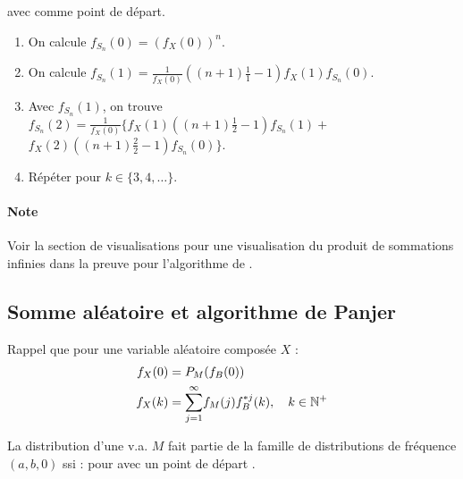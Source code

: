 \documentclass[10pt, french]{article}
\begin{document}
\begin{multicols*}{2}
\begin{algo2}
avec  comme point de départ.

\tcbline

\begin{enumerate}
	\item	On calcule $f_{S_{n}}(0)	=	\left(f_{X}(0)\right)^{n}$.
	\item	On calcule $f_{S_{n}}(1)	=	\frac{1}{f_{X}(0)} \left((n + 1)\frac{1}{1} - 1\right)f_{X}(1)f_{S_{n}}(0)$.
	\item	Avec $f_{S_{n}}(1)$, on trouve $f_{S_{n}}(2)	=	\frac{1}{f_{X}(0)} \bigg\{ f_{X}(1)\left((n + 1)\frac{1}{2} - 1\right)f_{S_{n}}(1)	+$ $ f_{X}(2)\left((n + 1)\frac{2}{2} - 1\right)f_{S_{n}}(0) \bigg\}$.
	\item	Répéter pour $k \in \{3, 4, \dots\}$.
\end{enumerate}
\end{algo2}

\paragraph{Note}	Voir la section de visualisations pour une visualisation du produit de sommations infinies dans la preuve pour l'algorithme de \textit{\underline{}}.


\columnbreak
\subsection{Somme aléatoire et algorithme de Panjer}
Rappel que pour une variable aléatoire composée $X$ : 
\begin{align*}
	f_{X}(0)
	&=	P_{M}(f_{B}(0))	\\
	f_{X}(k)
	&=	\overset{\infty}{\underset{j	=	1}{\sum}} f_{M}(j)f_{B}^{\ast j}(k), \quad k \in \mathbb{N}^{+}	
\end{align*}

\begin{definitionNOHFILL}
La distribution d'une v.a. $M$ fait partie de la famille de distributions de fréquence $(a, b, 0)$ ssi :  pour  avec un point de départ .\\


\end{definitionNOHFILL}
\end{multicols*}
\end{document}
